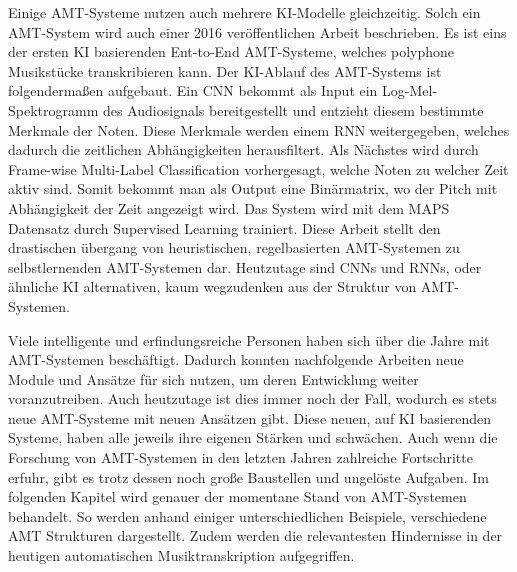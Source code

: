 Einige AMT-Systeme nutzen auch mehrere KI-Modelle gleichzeitig.
Solch ein AMT-System wird auch einer 2016 veröffentlichen Arbeit beschrieben.
\cite{sigtia2016end}
Es ist eins der ersten KI basierenden Ent-to-End AMT-Systeme, welches polyphone Musikstücke transkribieren kann.
Der KI-Ablauf des AMT-Systems ist folgendermaßen aufgebaut.
Ein CNN bekommt als Input ein Log-Mel-Spektrogramm des Audiosignals bereitgestellt
und entzieht diesem bestimmte Merkmale der Noten.
Diese Merkmale werden einem RNN weitergegeben, welches dadurch die zeitlichen Abhängigkeiten herausfiltert.
Als Nächstes wird durch Frame-wise Multi-Label Classification vorhergesagt, welche Noten zu welcher Zeit aktiv sind.
Somit bekommt man als Output eine Binärmatrix, wo der Pitch mit Abhängigkeit der Zeit angezeigt wird.
Das System wird mit dem MAPS Datensatz durch Supervised Learning trainiert.
Diese Arbeit stellt den drastischen übergang von heuristischen, regelbasierten AMT-Systemen
zu selbstlernenden AMT-Systemen dar.
Heutzutage sind CNNs und RNNs, oder ähnliche KI alternativen, kaum wegzudenken aus der Struktur von AMT-Systemen.

Viele intelligente und erfindungsreiche Personen haben sich über die Jahre mit AMT-Systemen beschäftigt.
Dadurch konnten nachfolgende Arbeiten neue Module und Ansätze für sich nutzen, um deren Entwicklung weiter voranzutreiben.
Auch heutzutage ist dies immer noch der Fall, wodurch es stets neue AMT-Systeme mit neuen Ansätzen gibt.
Diese neuen, auf KI basierenden Systeme, haben alle jeweils ihre eigenen Stärken und schwächen.
Auch wenn die Forschung von AMT-Systemen in den letzten Jahren zahlreiche Fortschritte erfuhr,
gibt es trotz dessen noch große Baustellen und ungelöste Aufgaben.
Im folgenden Kapitel wird genauer der momentane Stand von AMT-Systemen behandelt.
So werden anhand einiger unterschiedlichen Beispiele, verschiedene AMT Strukturen dargestellt.
Zudem werden die relevantesten Hindernisse in der heutigen automatischen Musiktranskription aufgegriffen.